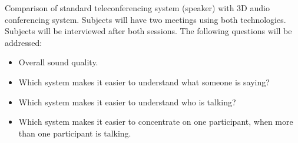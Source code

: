 \documentclass{assign}
\begin{document}
Comparison of standard teleconferencing system (speaker) with 3D audio
conferencing system. Subjects will have two meetings using both technologies.
Subjects will be interviewed after both sessions. The following questions will
be addressed:
\begin{itemize}
  \item Overall sound quality.
  \item Which system makes it easier to understand what someone is saying?
  \item Which system makes it easier to understand who is talking?
  \item Which system makes it easier to concentrate on one participant, when
  more than one participant is talking.
\end{itemize}
\end{document}
